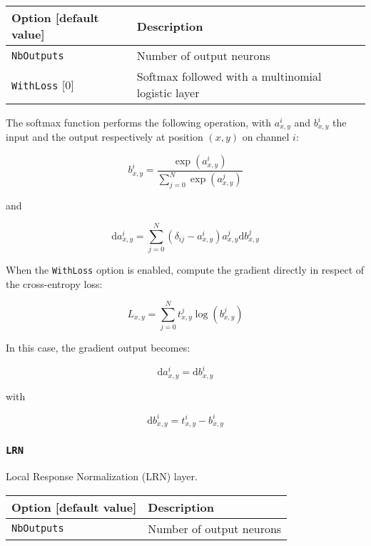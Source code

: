\documentclass[a4paper,11pt,oneside]{article}
\begin{document}
\begin{center}
 \begin{longtable}{| p{5cm} | p{10cm} | }
 \hline
 Option [default value] & Description\\
 \hline\hline
  \cellcolor{requiredcolor}\lstinline!NbOutputs! & Number of output neurons \\
  \lstinline!WithLoss! [0] & Softmax followed with a multinomial logistic
  layer \\
 \hline
\end{longtable}
\end{center}

The softmax function performs the following operation, with $a_{x,y}^{i}$ and
$b_{x,y}^{i}$ the input and the output respectively at position $(x,y)$ on
channel $i$:

\[ b_{x,y}^{i} = \frac{\exp(a_{x,y}^{i})}{\sum\limits_{j=0}^{N}
    {\exp(a_{x,y}^{j})}} \]

and

\[ \text{d}a_{x,y}^{i} = \sum\limits_{j=0}^{N}{\left(\delta_{ij}
- a_{x,y}^{i}\right) a_{x,y}^{j} \text{d}b_{x,y}^{j}} \]


When the \lstinline!WithLoss! option is enabled, compute the gradient directly
in respect of the cross-entropy loss:

\[ L_{x,y} = \sum\limits_{j=0}^{N}{t_{x,y}^{j} \log(b_{x,y}^{j})} \]

In this case, the gradient output becomes:

\[ \text{d}a_{x,y}^{i} = \text{d}b_{x,y}^{i} \]

with

\[ \text{d}b_{x,y}^{i} = t_{x,y}^{i} - b_{x,y}^{i} \]


\subsubsection{\texorpdfstring{%
\lstinline[basicstyle=\ttfamily\bfseries]!LRN!}{LRN}}
Local Response Normalization (LRN) layer.

\begin{center}
 \begin{longtable}{| p{5cm} | p{10cm} | }
 \hline
 Option [default value] & Description\\
 \hline\hline
  \cellcolor{requiredcolor}\lstinline!NbOutputs! & Number of output neurons \\
 \hline
\end{longtable}
\end{center}
\end{document}
